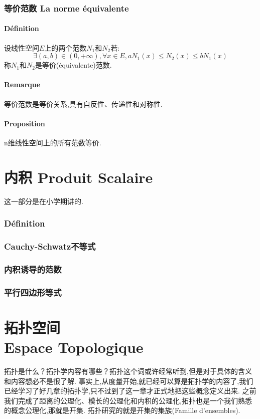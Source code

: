 \documentclass[12pt, a4paper, oneside]{ctexbook}
\begin{document}
  \subsection{等价范数 La norme équivalente}
  \subsubsection{Définition}
  设线性空间$E$上的两个范数$N_1$和$N_2$若:
  $$
    \exists(a,b)\in(0,+\infty),\forall x\in E,aN_1(x)\leq N_2(x)\leq bN_1(x)
  $$称$N_1$和$N_2$是等价(équivalente)范数.
  \subsubsection{Remarque}
  等价范数是等价关系,具有自反性、传递性和对称性.
  \subsubsection{Proposition}
  n维线性空间上的所有范数等价.

\chapter{内积 Produit Scalaire}
  这一部分是在小学期讲的.
    \subsection{Définition}
    \subsection{Cauchy-Schwatz不等式}
    \subsection{内积诱导的范数}
    \subsection{平行四边形等式}


\chapter{拓扑空间\\ Espace Topologique}
拓扑是什么？拓扑学内容有哪些？拓扑这个词或许经常听到,但是对于具体的含义和内容想必不是很了解.
事实上,从度量开始,就已经可以算是拓扑学的内容了,我们已经学习了好几章的拓扑学,只不过到了这一章才正式地把这些概念定义出来.
之前我们完成了距离的公理化、模长的公理化和内积的公理化,拓扑也是一个我们熟悉的概念公理化,那就是开集.
拓扑研究的就是开集的集族(Famille d'ensembles).
\end{document}
